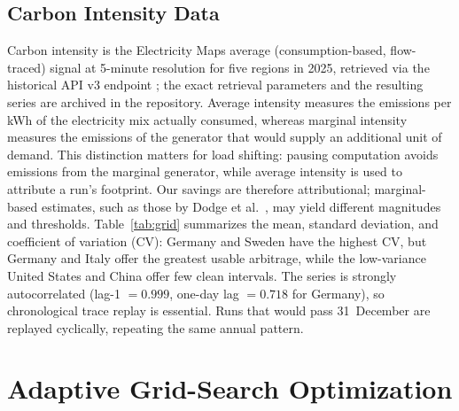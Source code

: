 \documentclass[runningheads]{llncs}
\begin{document}
\subsection{Carbon Intensity Data}

\begin{table}
  \centering
  \caption{Grid carbon intensity characteristics (2025). Regions ordered
  by coefficient of variation.}
  \label{tab:grid}
  \small
  
\end{table}

Carbon intensity is the Electricity Maps average (consumption-based,
flow-traced) signal at 5-minute resolution for five regions in 2025,
retrieved via the historical API v3 endpoint
; the exact retrieval parameters
and the resulting series are archived in the repository. Average
intensity measures the emissions per kWh of the electricity mix
actually consumed, whereas marginal intensity measures the emissions
of the generator that would supply an additional unit of demand.
This distinction matters for load shifting: pausing computation avoids
emissions from the marginal generator, while average intensity is used
to attribute a run's footprint. Our savings are therefore attributional;
marginal-based estimates, such as those by
Dodge et al.~\cite{dodge_measuring_2022}, may yield different magnitudes
and thresholds. Table~\ref{tab:grid} summarizes the mean,
standard deviation, and coefficient of variation (CV): Germany and
Sweden have the highest CV, but Germany and Italy offer the greatest
usable arbitrage, while the low-variance United States and China
offer few clean intervals. The series is strongly autocorrelated
(lag-1 $= 0.999$, one-day lag $= 0.718$ for Germany), so
chronological trace replay is essential. Runs that would pass
31~December are replayed cyclically, repeating the same annual pattern.

\section{Adaptive Grid-Search Optimization} \label{sec:opti-algo}
\end{document}
